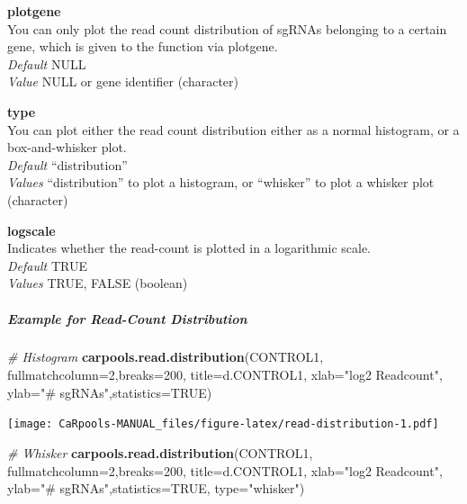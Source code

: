 \documentclass[]{article}
\newenvironment{Shaded}{\begin{snugshade}}{\end{snugshade}}
\newcommand{\KeywordTok}[1]{\textcolor[rgb]{0.13,0.29,0.53}{\textbf{{#1}}}}
\newcommand{\DataTypeTok}[1]{\textcolor[rgb]{0.13,0.29,0.53}{{#1}}}
\newcommand{\DecValTok}[1]{\textcolor[rgb]{0.00,0.00,0.81}{{#1}}}
\newcommand{\StringTok}[1]{\textcolor[rgb]{0.31,0.60,0.02}{{#1}}}
\newcommand{\CommentTok}[1]{\textcolor[rgb]{0.56,0.35,0.01}{\textit{{#1}}}}
\newcommand{\OtherTok}[1]{\textcolor[rgb]{0.56,0.35,0.01}{{#1}}}
\newcommand{\NormalTok}[1]{{#1}}
\let\oldsubparagraph\subparagraph
\renewcommand{\subparagraph}[1]{\oldsubparagraph{#1}\mbox{}}
\begin{document}
\textbf{plotgene}\\
You can only plot the read count distribution of sgRNAs belonging to a
certain gene, which is given to the function via plotgene.\\
\emph{Default} NULL\\
\emph{Value} NULL or gene identifier (character)

\textbf{type}\\
You can plot either the read count distribution either as a normal
histogram, or a box-and-whisker plot.\\
\emph{Default} ``distribution''\\
\emph{Values} ``distribution'' to plot a histogram, or ``whisker'' to
plot a whisker plot (character)

\textbf{logscale}\\
Indicates whether the read-count is plotted in a logarithmic scale.\\
\emph{Default} TRUE\\
\emph{Values} TRUE, FALSE (boolean)

\subparagraph{Example for Read-Count
Distribution}\label{example-for-read-count-distribution}

\begin{Shaded}
\begin{Highlighting}[]
\CommentTok{# Histogram}
\KeywordTok{carpools.read.distribution}\NormalTok{(CONTROL1, }\DataTypeTok{fullmatchcolumn=}\DecValTok{2}\NormalTok{,}\DataTypeTok{breaks=}\DecValTok{200}\NormalTok{,}
  \DataTypeTok{title=}\NormalTok{d.CONTROL1, }\DataTypeTok{xlab=}\StringTok{"log2 Readcount"}\NormalTok{, }\DataTypeTok{ylab=}\StringTok{"# sgRNAs"}\NormalTok{,}\DataTypeTok{statistics=}\OtherTok{TRUE}\NormalTok{) }
\end{Highlighting}
\end{Shaded}

\texttt{[image: CaRpools-MANUAL\_files/figure-latex/read-distribution-1.pdf]}

\begin{Shaded}
\begin{Highlighting}[]
\CommentTok{# Whisker}
\KeywordTok{carpools.read.distribution}\NormalTok{(CONTROL1, }\DataTypeTok{fullmatchcolumn=}\DecValTok{2}\NormalTok{,}\DataTypeTok{breaks=}\DecValTok{200}\NormalTok{,}
  \DataTypeTok{title=}\NormalTok{d.CONTROL1, }\DataTypeTok{xlab=}\StringTok{"log2 Readcount"}\NormalTok{, }\DataTypeTok{ylab=}\StringTok{"# sgRNAs"}\NormalTok{,}\DataTypeTok{statistics=}\OtherTok{TRUE}\NormalTok{,}
  \DataTypeTok{type=}\StringTok{"whisker"}\NormalTok{) }
\end{Highlighting}
\end{Shaded}
\end{document}
